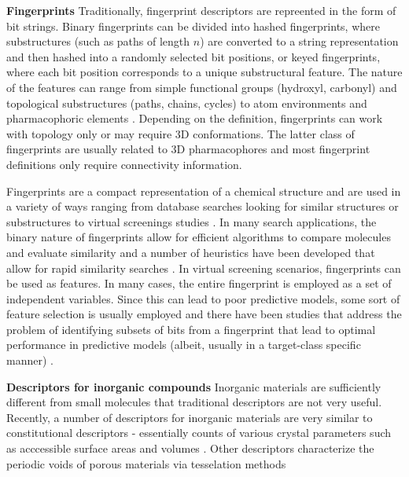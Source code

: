 \documentclass[letterpaper, 12pt]{article}
\begin{document}
\textbf{Fingerprints} Traditionally, fingerprint descriptors are
repreented in the form of bit strings. Binary fingerprints can be
divided into hashed fingerprints, where substructures (such as paths
of length $n$) are converted to a string representation and then
hashed into a randomly selected bit positions, or keyed fingerprints,
where each bit position corresponds to a unique substructural
feature. The nature of the features can range from simple functional
groups (hydroxyl, carbonyl) and topological substructures (paths,
chains, cycles) to atom environments \cite{Bremser1978,Bender:2004aa}
and pharmacophoric elements \cite{Renner:2006aa}. Depending on the
definition, fingerprints can work with topology only or may require 3D
conformations. The latter class of fingerprints are usually related to
3D pharmacophores and most fingerprint definitions only require
connectivity information. 

Fingerprints are a compact representation of a chemical structure and
are used in a variety of ways ranging from database searches looking
for similar structures or substructures to virtual screenings studies
\cite{Sun:2006kx}. In many search applications, the binary nature of
fingerprints allow for efficient algorithms to compare molecules and
evaluate similarity and a number of heuristics have been developed
that allow for rapid similarity searches
\cite{Baldi:2008aa,Swamidass:2007ab}. In virtual screening scenarios,
fingerprints can be used as features. In many cases, the entire
fingerprint is employed as a set of independent variables. Since this
can lead to poor predictive models, some sort of feature selection is
usually employed and there have been studies that address the problem
of identifying subsets of bits from a fingerprint that lead to optimal
performance in predictive models (albeit, usually in a target-class
specific manner) \cite{Xue:2004fk}.


\textbf{Descriptors for inorganic compounds} Inorganic materials are
sufficiently different from small molecules that traditional
descriptors are not very useful. Recently, a number of descriptors for
inorganic materials are very similar to constitutional descriptors -
essentially counts of various crystal parameters such as acccessible
surface areas and volumes
\cite{Willems:2012zr,Haranczyk:2010ys,Mackay:1984ve}. Other
descriptors characterize the periodic voids of porous materials via
tesselation methods \cite{Anurova:2009ly,Carr:2009kx}
\end{document}
